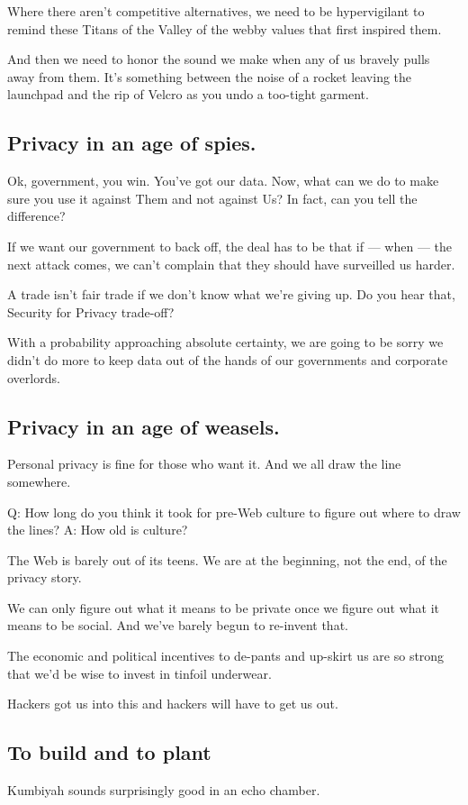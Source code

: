 \documentclass[letterpaper,12pt,english]{sphinxmanual}
\begin{document}
Where there aren't competitive alternatives, we need to be hypervigilant to remind these Titans of the Valley of the webby values that first inspired them.

And then we need to honor the sound we make when any of us bravely pulls away from them. It's something between the noise of a rocket leaving the launchpad and the rip of Velcro as you undo a too-tight garment.


\subsection{Privacy in an age of spies.}
\label{2015newclues:privacy-in-an-age-of-spies}
Ok, government, you win. You've got our data. Now, what can we do to make sure you use it against Them and not against Us? In fact, can you tell the difference?

If we want our government to back off, the deal has to be that if — when — the next attack comes, we can't complain that they should have surveilled us harder.

A trade isn't fair trade if we don't know what we're giving up. Do you hear that, Security for Privacy trade-off?

With a probability approaching absolute certainty, we are going to be sorry we didn't do more to keep data out of the hands of our governments and corporate overlords.


\subsection{Privacy in an age of weasels.}
\label{2015newclues:privacy-in-an-age-of-weasels}
Personal privacy is fine for those who want it. And we all draw the line somewhere.

Q: How long do you think it took for pre-Web culture to figure out where to draw the lines? A: How old is culture?

The Web is barely out of its teens. We are at the beginning, not the end, of the privacy story.

We can only figure out what it means to be private once we figure out what it means to be social. And we've barely begun to re-invent that.

The economic and political incentives to de-pants and up-skirt us are so strong that we'd be wise to invest in tinfoil underwear.

Hackers got us into this and hackers will have to get us out.


\subsection{To build and to plant}
\label{2015newclues:to-build-and-to-plant}
Kumbiyah sounds surprisingly good in an echo chamber.
\end{document}
